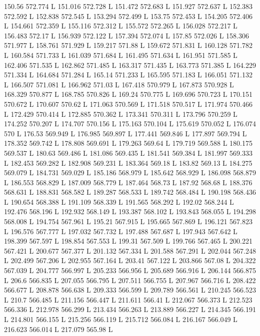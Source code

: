 150.56 572.774 L
151.016 572.728 L
151.472 572.683 L
151.927 572.637 L
152.383 572.592 L
152.838 572.545 L
153.294 572.499 L
153.75 572.453 L
154.205 572.406 L
154.661 572.359 L
155.116 572.312 L
155.572 572.265 L
156.028 572.217 L
156.483 572.17 L
156.939 572.122 L
157.394 572.074 L
157.85 572.026 L
158.306 571.977 L
158.761 571.929 L
159.217 571.88 L
159.672 571.831 L
160.128 571.782 L
160.584 571.733 L
161.039 571.684 L
161.495 571.634 L
161.951 571.585 L
162.406 571.535 L
162.862 571.485 L
163.317 571.435 L
163.773 571.385 L
164.229 571.334 L
164.684 571.284 L
165.14 571.233 L
165.595 571.183 L
166.051 571.132 L
166.507 571.081 L
166.962 571.03 L
167.418 570.979 L
167.873 570.928 L
168.329 570.877 L
168.785 570.826 L
169.24 570.775 L
169.696 570.723 L
170.151 570.672 L
170.607 570.62 L
171.063 570.569 L
171.518 570.517 L
171.974 570.466 L
172.429 570.414 L
172.885 570.362 L
173.341 570.311 L
173.796 570.259 L
174.252 570.207 L
174.707 570.156 L
175.163 570.104 L
175.619 570.052 L
176.074 570 L
176.53 569.949 L
176.985 569.897 L
177.441 569.846 L
177.897 569.794 L
178.352 569.742 L
178.808 569.691 L
179.263 569.64 L
179.719 569.588 L
180.175 569.537 L
180.63 569.486 L
181.086 569.435 L
181.541 569.384 L
181.997 569.333 L
182.453 569.282 L
182.908 569.231 L
183.364 569.18 L
183.82 569.13 L
184.275 569.079 L
184.731 569.029 L
185.186 568.979 L
185.642 568.929 L
186.098 568.879 L
186.553 568.829 L
187.009 568.779 L
187.464 568.73 L
187.92 568.68 L
188.376 568.631 L
188.831 568.582 L
189.287 568.533 L
189.742 568.484 L
190.198 568.436 L
190.654 568.388 L
191.109 568.339 L
191.565 568.292 L
192.02 568.244 L
192.476 568.196 L
192.932 568.149 L
193.387 568.102 L
193.843 568.055 L
194.298 568.008 L
194.754 567.961 L
195.21 567.915 L
195.665 567.869 L
196.121 567.823 L
196.576 567.777 L
197.032 567.732 L
197.488 567.687 L
197.943 567.642 L
198.399 567.597 L
198.854 567.553 L
199.31 567.509 L
199.766 567.465 L
200.221 567.421 L
200.677 567.377 L
201.132 567.334 L
201.588 567.291 L
202.044 567.248 L
202.499 567.206 L
202.955 567.164 L
203.41 567.122 L
203.866 567.08 L
204.322 567.039 L
204.777 566.997 L
205.233 566.956 L
205.689 566.916 L
206.144 566.875 L
206.6 566.835 L
207.055 566.795 L
207.511 566.755 L
207.967 566.716 L
208.422 566.677 L
208.878 566.638 L
209.333 566.599 L
209.789 566.561 L
210.245 566.523 L
210.7 566.485 L
211.156 566.447 L
211.611 566.41 L
212.067 566.373 L
212.523 566.336 L
212.978 566.299 L
213.434 566.263 L
213.889 566.227 L
214.345 566.191 L
214.801 566.155 L
215.256 566.119 L
215.712 566.084 L
216.167 566.049 L
216.623 566.014 L
217.079 565.98 L
